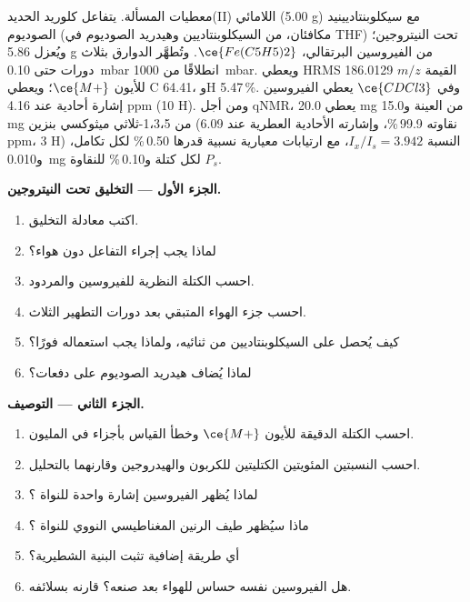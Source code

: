 \begin{problem}
\label{pb:b3:lab-techniques-3:1}
معطيات المسألة. يتفاعل كلوريد الحديد(II) اللامائي (5.00 g) مع
سيكلوبنتاديينيد الصوديوم (مكافئان، من السيكلوبنتاديين وهيدريد الصوديوم في
THF) تحت النيتروجين؛ ويُعزل 5.86 g من الفيروسين البرتقالي، $\ce{Fe(C5H5)2}$. وتُطهَّر الدوارق
بثلاث دورات حتى \qty{0.10}{mbar} انطلاقًا من \qty{1000}{mbar}. ويعطي HRMS القيمة $m/z$ 186.0129 للأيون $\ce{M+}$؛ ويعطي  C 64.41، وH 5.47\,\%. وفي $\ce{CDCl3}$ يعطي الفيروسين إشارة أحادية عند 4.16 ppm (10 H). ومن أجل qNMR،
يعطي 20.0 mg من العينة و15.0 mg من 1،3،5-ثلاثي ميثوكسي بنزين (نقاوته 99.9\,\%، وإشارته الأحادية
العطرية عند 6.09 ppm، 3 H) النسبة $I_x/I_s = 3.942$، مع ارتيابات معيارية نسبية قدرها 0.50\,\% لكل
تكامل، و\qty{0.010}{mg} لكل كتلة و0.10\,\% للنقاوة $P_s$.

\medskip\noindent\textbf{الجزء الأول --- التخليق تحت النيتروجين.}
\begin{enumerate}
  \item اكتب معادلة التخليق.
  \item لماذا يجب إجراء التفاعل دون هواء؟
  \item احسب الكتلة النظرية للفيروسين والمردود.
  \item احسب جزء الهواء المتبقي بعد دورات التطهير الثلاث.
  \item كيف يُحصل على السيكلوبنتاديين من ثنائيه، ولماذا يجب استعماله فورًا؟
  \item لماذا يُضاف هيدريد الصوديوم على دفعات؟
\end{enumerate}

\medskip\noindent\textbf{الجزء الثاني --- التوصيف.}
\begin{enumerate}[resume]
  \item احسب الكتلة الدقيقة للأيون $\ce{M+}$ وخطأ القياس بأجزاء في المليون.
  \item احسب النسبتين المئويتين الكتليتين للكربون والهيدروجين وقارنهما بالتحليل.
  \item لماذا يُظهر الفيروسين إشارة واحدة للنواة ؟
  \item ماذا سيُظهر طيف الرنين المغناطيسي النووي للنواة ؟
  \item أي طريقة إضافية تثبت البنية الشطيرية؟
  \item هل الفيروسين نفسه حساس للهواء بعد صنعه؟ قارنه بسلائفه.
\end{enumerate}


\end{problem}
